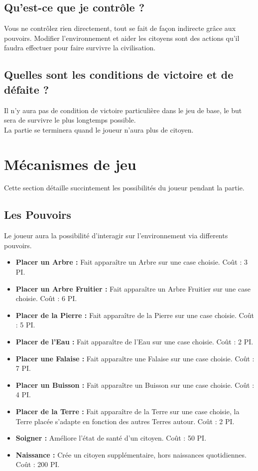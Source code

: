 \documentclass[a4paper]{memoir}
\begin{document}
			\subsection{Qu'est-ce que je contrôle ?}
				Vous ne contrôlez rien directement, tout se fait de façon indirecte grâce aux pouvoirs. Modifier l'environnement et aider les citoyens sont des actions qu'il faudra effectuer pour faire survivre la civilisation.
	
			\subsection{Quelles sont les conditions de victoire et de défaite ?}
				Il n'y aura pas de condition de victoire particulière dans le jeu de base, le but sera de survivre le plus longtemps possible.\\
				La partie se terminera quand le joueur n'aura plus de citoyen.
			
		\section{Mécanismes de jeu}
			Cette section détaille succintement les possibilités du joueur pendant la partie.
			
			\subsection{Les Pouvoirs}
				\label{Pouvoirs}
				Le joueur aura la possibilité d'interagir sur l'environnement via differents pouvoirs.
				
				\begin{itemize}[label=$\bullet$]
					\item \textbf{Placer un Arbre :} Fait apparaître un Arbre sur une case choisie. Coût : 3 PI.
					\item \textbf{Placer un Arbre Fruitier :} Fait apparaître un Arbre Fruitier sur une case choisie. Coût : 6 PI.
					\item \textbf{Placer de la Pierre :} Fait apparaître de la Pierre sur une case choisie. Coût : 5 PI.
					\item \textbf{Placer de l'Eau :} Fait apparaître de l'Eau sur une case choisie. Coût : 2 PI.
					\item \textbf{Placer une Falaise :} Fait apparaître une Falaise sur une case choisie. Coût : 7 PI.
					\item \textbf{Placer un Buisson :} Fait apparaître un Buisson sur une case choisie. Coût : 4 PI.
					\item \textbf{Placer de la Terre :} Fait apparaître de la Terre sur une case choisie, la Terre placée s'adapte en fonction des autres Terres autour. Coût : 2 PI.
				\end{itemize}
				\begin{itemize}[label=$\bullet$]
					\item \textbf{Soigner :} Améliore l'état de santé d'un citoyen. Coût : 50 PI.
					\item \textbf{Naissance :} Crée un citoyen supplémentaire, hors naissances quotidiennes. Coût : 200 PI.
				\end{itemize}
\end{document}
